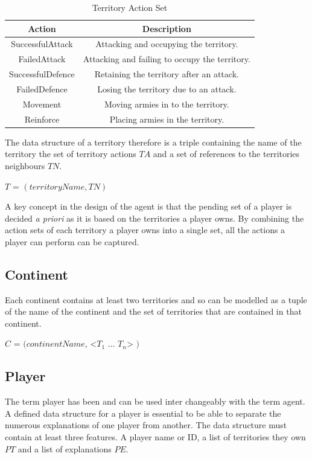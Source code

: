 \documentclass[parskip]{cs4rep}
\begin{document}
\begin{table}[ht]
\centering
\begin{tabular}{|c|c|}
\hline 
\textbf{Action} & \textbf{Description} \\ 
\hline 
SuccessfulAttack & Attacking and occupying the territory.\\ 
\hline 
FailedAttack & Attacking and failing to occupy the territory.\\ 
\hline 
SuccessfulDefence & Retaining the territory after an attack.\\ 
\hline 
FailedDefence & Losing the territory due to an attack.\\
\hline
Movement & Moving armies in to the territory.\\
\hline  
Reinforce & Placing armies in the territory.\\
\hline 
\end{tabular}
\caption{Territory Action Set}
\label{table:territory-actions-bonus}
\end{table}

\newpage

The data structure of a territory therefore is a triple containing the name of the territory the set of territory actions $TA$ and a set of references to the territories neighbours $TN$.

\centerline{
$T$ = $( territoryName, TN )$
}

A key concept in the design of the agent is that the pending set of a player is decided \textit{a priori} as it is based on the territories a player owns. By combining the action sets of each territory a player owns into a single set, all the actions a player can perform can be captured.

\subsection{Continent}

Each continent contains at least two territories and so can be modelled as a tuple of the name of the continent and the set of territories that are contained in that continent.

\centerline{
$C$ = $( continentName$, <$T_{1}$ ... $T_{n}$> $)$
}

\subsection{Player}

The term player has been and can be used inter changeably with the term agent. A defined data structure for a player is essential to be able to separate the numerous explanations of one player from another. The data structure must contain at least three features. A player name or ID, a list of territories they own $PT$ and a list of explanations $PE$.\newline
\end{document}
